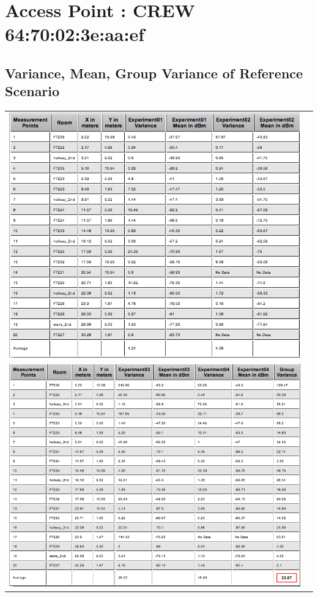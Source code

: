 \documentclass[11pt,a4paper,headinclude,footinclude,chapterprefix=on]{scrreprt}
\begin{document}
\section{Access Point : CREW 64:70:02:3e:aa:ef} 
\subsection{Variance, Mean, Group Variance of Reference Scenario} 
\begin{longtable}
	{lr} 
	\includegraphics[width=15cm]{../../Source/plot/data/ef_ref1.png} \\
	\includegraphics[width=15cm]{../../Source/plot/data/ef_ref2.png} \\
\end{longtable}
\end{document}
